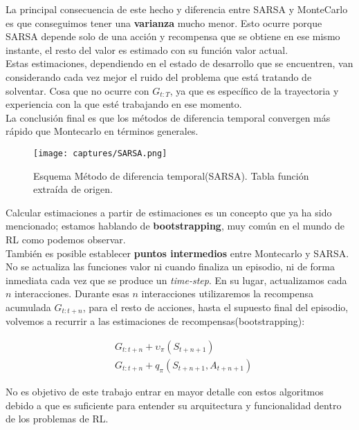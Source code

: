 \documentclass[11pt,fleqn]{book} %
\begin{document}
La principal consecuencia de este hecho y diferencia entre SARSA y MonteCarlo es que conseguimos tener una \textbf{varianza} mucho menor. Esto ocurre porque SARSA depende solo de una acción y recompensa que se obtiene en ese mismo instante, el resto del valor es estimado con su función valor actual. \\

Estas estimaciones, dependiendo en el estado de desarrollo que se encuentren, van considerando cada vez mejor el ruido del problema que está tratando de solventar. Cosa que no ocurre con $G_{t:T}$, ya que es específico de la trayectoria y experiencia con la que esté trabajando en ese momento. \\

La conclusión final es que los métodos de diferencia temporal convergen más rápido que Montecarlo en términos generales. \\ 

\begin{figure}[H]
	\centering\texttt{[image: captures/SARSA.png]}
	\caption{Esquema Método de diferencia temporal(SARSA). Tabla función extraída de origen. \cite{article:RLromero}}
	\label{fig:SARSA} %
\end{figure}

Calcular estimaciones a partir de estimaciones es un concepto que ya ha sido mencionado; estamos hablando de \textbf{bootstrapping}, muy común en el mundo de RL como podemos observar.\\

También es posible establecer \textbf{puntos intermedios} entre Montecarlo y SARSA. No se actualiza las funciones valor ni cuando finaliza un episodio, ni de forma inmediata cada vez que se produce un \textit{time-step}. En su lugar, actualizamos cada $n$ interacciones. Durante esas $n$ interacciones utilizaremos la recompensa acumulada $G_{t:t+n}$, para el resto de acciones, hasta el supuesto final del episodio, volvemos a recurrir a las estimaciones de recompensas(bootstrapping):

\begin{align*}
&G_{t:t+n}+\upsilon_\pi(S_{t+n+1}) \\
&G_{t:t+n}+q_\pi(S_{t+n+1},A_{t+n+1})
\end{align*}

No es objetivo de este trabajo entrar en mayor detalle con estos algoritmos debido a que es suficiente para entender su arquitectura y funcionalidad dentro de los problemas de RL.
\end{document}

